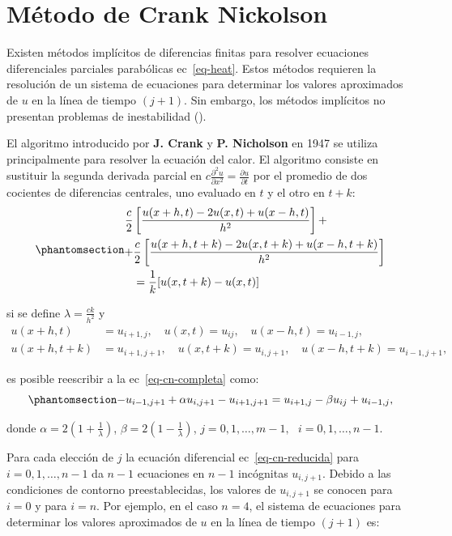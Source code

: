 \documentclass[
  spanish,
  us-letterpaper,
  DIV=11,
  numbers=noendperiod]{scrreprt}
\theoremstyle{plain}
\theoremstyle{definition}
\theoremstyle{remark}
\begin{document}
\chapter{Método de Crank Nickolson}\label{muxe9todo-de-crank-nickolson}

Existen métodos implícitos de diferencias finitas para resolver
ecuaciones diferenciales parciales parabólicas ec~\ref{eq-heat}. Estos
métodos requieren la resolución de un sistema de ecuaciones para
determinar los valores aproximados de \(u\) en la línea de tiempo
\((j + 1)\). Sin embargo, los métodos implícitos no presentan problemas
de inestabilidad ().

El algoritmo introducido por \textbf{J. Crank} y \textbf{P. Nicholson}
en 1947 se utiliza principalmente para resolver la ecuación del calor.
El algoritmo consiste en sustituir la segunda derivada parcial en
\(c\frac{\partial^2 u}{\partial x^2} = \frac{\partial u}{\partial t}\)
por el promedio de dos cocientes de diferencias centrales, uno evaluado
en \(t\) y el otro en \(t+k\):
\begin{equation}\phantomsection\label{eq-cn-completa}{
\begin{split}
\dfrac{c}{2}& \left[\dfrac{u(x+h,t)-2u(x,t)+u(x-h,t)}{h^2}\right] + \\
    + &\dfrac{c}{2} \left[\dfrac{u(x+h,t+k)-2u(x,t+k)+u(x-h,t+k)}{h^2} \right] \\
            &= \dfrac{1}{k}[u(x,t+k)-u(x,t)]
\end{split}
}\end{equation}

si se define \(\lambda = \frac{ck}{h^2}\) y \[
\begin{split}
u(x+h,t) &=u_{i+1,j}, \quad u(x,t)=u_{ij}, \quad u(x-h,t)=u_{i-1,j}, \\
u(x+h,t+k) &=u_{i+1,j+1}, \quad u(x,t+k)=u_{i,j+1}, \quad u(x-h,t+k)=u_{i-1,j+1},
\end{split}
\]

es posible reescribir a la ec~\ref{eq-cn-completa} como:
\begin{equation}\phantomsection\label{eq-cn-reducida}{
-u_{i-1,j+1} + \alpha u_{i,j+1} - u_{i+1,j+1} = u_{i+1,j} - \beta u_{ij} + u_{i-1,j},
}\end{equation}

donde \(\alpha=2(1+\frac{1}{\lambda})\),
\(\beta=2(1-\frac{1}{\lambda})\),
\(j=0,1,\dots, m-1, \ \ \ i=0,1,\dots, n-1\).

Para cada elección de \(j\) la ecuación diferencial
ec~\ref{eq-cn-reducida} para \(i=0,1,\dots, n-1\) da \(n-1\) ecuaciones
en \(n-1\) incógnitas \(u_{i,j+1}\). Debido a las condiciones de
contorno preestablecidas, los valores de \(u_{i, j+1}\) se conocen para
\(i=0\) y para \(i=n\). Por ejemplo, en el caso \(n=4\), el sistema de
ecuaciones para determinar los valores aproximados de \(u\) en la línea
de tiempo \((j+1)\) es:
\end{document}
